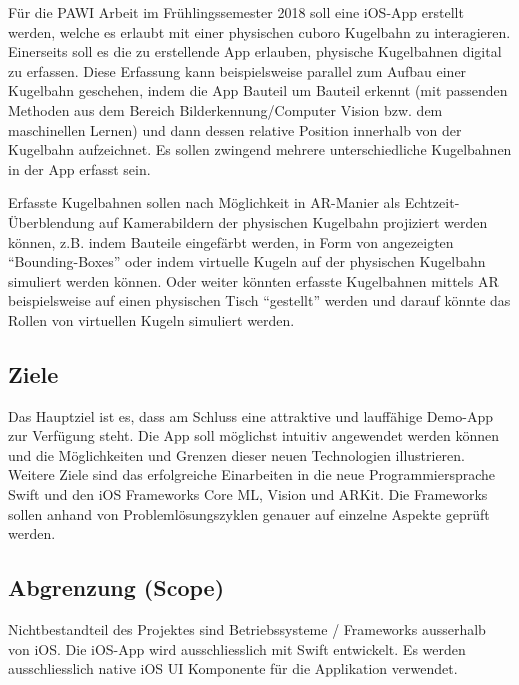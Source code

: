 Für die PAWI Arbeit im Frühlingssemester 2018 soll eine iOS-App erstellt werden, welche es erlaubt mit einer physischen cuboro Kugelbahn zu interagieren. Einerseits soll es die zu erstellende App erlauben, physische Kugelbahnen digital zu erfassen. Diese Erfassung kann beispielsweise parallel zum Aufbau einer Kugelbahn geschehen, indem die App Bauteil um Bauteil erkennt (mit passenden Methoden aus dem Bereich Bilderkennung/Computer Vision bzw. dem maschinellen Lernen) und dann dessen relative Position innerhalb von der Kugelbahn aufzeichnet. Es sollen zwingend mehrere unterschiedliche Kugelbahnen in der App erfasst sein.


Erfasste Kugelbahnen sollen nach Möglichkeit in AR-Manier als Echtzeit-Überblendung auf Kamerabildern der physischen Kugelbahn projiziert werden können, z.B. indem Bauteile eingefärbt werden, in Form von angezeigten "`Bounding-Boxes"' oder indem virtuelle Kugeln auf der physischen Kugelbahn simuliert werden können. Oder weiter könnten erfasste Kugelbahnen mittels AR beispielsweise auf einen physischen Tisch "`gestellt"' werden und darauf könnte das Rollen von virtuellen Kugeln simuliert werden. 

\subsection{Ziele}
Das Hauptziel ist es, dass am Schluss eine attraktive und lauffähige Demo-App zur Verfügung steht. Die App soll möglichst intuitiv angewendet werden können und die Möglichkeiten und Grenzen dieser neuen Technologien illustrieren. Weitere Ziele sind das erfolgreiche Einarbeiten in die neue Programmiersprache Swift und den iOS Frameworks Core ML, Vision und ARKit. Die Frameworks sollen anhand von Problemlösungszyklen genauer auf einzelne Aspekte geprüft werden.

\subsection{Abgrenzung (Scope)}
Nichtbestandteil des Projektes sind Betriebssysteme / Frameworks ausserhalb von iOS. Die iOS-App wird ausschliesslich mit Swift entwickelt. Es werden ausschliesslich native iOS UI Komponente für die Applikation verwendet.
